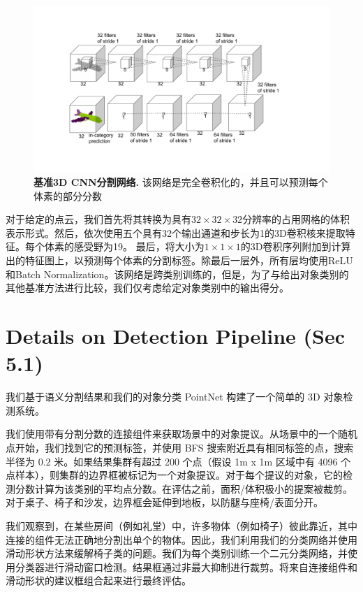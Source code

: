 \begin{figure}[t!]
\centering
\includegraphics[width=\linewidth]{fig/voxnet.pdf}
\caption{\textbf{基准3D CNN分割网络.} 该网络是完全卷积化的，并且可以预测每个体素的部分分数}
\label{fig:voxnet}
\end{figure}
对于给定的点云，我们首先将其转换为具有$32 \times 32 \times 32$分辨率的占用网格的体积表示形式。然后，依次使用五个具有32个输出通道和步长为1的3D卷积核来提取特征。每个体素的感受野为19。 %
最后，将大小为$1\times 1\times 1$的3D卷积序列附加到计算出的特征图上，以预测每个体素的分割标签。除最后一层外，所有层均使用ReLU和Batch Normalization。该网络是跨类别训练的，但是，为了与给出对象类别的其他基准方法进行比较，我们仅考虑给定对象类别中的输出得分。

\section{Details on Detection Pipeline (Sec 5.1)}
\label{sec:detection}
我们基于语义分割结果和我们的对象分类 PointNet 构建了一个简单的 3D 对象检测系统。

我们使用带有分割分数的连接组件来获取场景中的对象提议。从场景中的一个随机点开始，我们找到它的预测标签，并使用 BFS 搜索附近具有相同标签的点，搜索半径为 $0.2$ 米。如果结果集群有超过 200 个点（假设 1m x 1m 区域中有 4096 个点样本），则集群的边界框被标记为一个对象提议。对于每个提议的对象，它的检测分数计算为该类别的平均点分数。在评估之前，面积/体积极小的提案被裁剪。对于桌子、椅子和沙发，边界框会延伸到地板，以防腿与座椅/表面分开。

我们观察到，在某些房间（例如礼堂）中，许多物体（例如椅子）彼此靠近，其中连接的组件无法正确地分割出单个的物体。因此，我们利用我们的分类网络并使用滑动形状方法来缓解椅子类的问题。我们为每个类别训练一个二元分类网络，并使用分类器进行滑动窗口检测。结果框通过非最大抑制进行裁剪。将来自连接组件和滑动形状的建议框组合起来进行最终评估。

